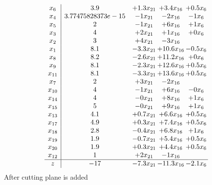\documentclass[11pt]{article}
\begin{document}
\[\begin{array}{c| c c@{\hskip 2pt} c@{\hskip 2pt} c@{\hskip 2pt} }
 x_{6}   &  3.9 & + 1.3 x_{21} & + 3.4 x_{16} & + 0.5 x_{6}\\
 x_{4}   &  3.77475828373e-15 & -1 x_{21} & -2 x_{16} & -1 x_{6}\\
 x_{5}   &  2 & -1 x_{21} & + 6 x_{16} & + 1 x_{6}\\
 x_{3}   &  4 & + 2 x_{21} & + 1 x_{16} & + 0 x_{6}\\
 x_{2}   &  3 & + 4 x_{21} & -3 x_{16} &   \\
 x_{1}   &  8.1 & -3.3 x_{21} & + 10.6 x_{16} & -0.5 x_{6}\\
 x_{8}   &  8.2 & -2.6 x_{21} & + 11.2 x_{16} & + 0 x_{6}\\
 x_{9}   &  8.1 & -2.3 x_{21} & + 12.6 x_{16} & + 0.5 x_{6}\\
 x_{11}   &  8.1 & -3.3 x_{21} & + 13.6 x_{16} & + 0.5 x_{6}\\
 x_{7}   &  2 & + 3 x_{21} & -2 x_{16} &   \\
 x_{10}   &  4 & -1 x_{21} & + 6 x_{16} & -0 x_{6}\\
 x_{14}   &  4 & -0 x_{21} & + 8 x_{16} & + 1 x_{6}\\
 x_{15}   &  5 & -0 x_{21} & + 9 x_{16} & + 1 x_{6}\\
 x_{13}   &  4.1 & + 0.7 x_{21} & + 6.6 x_{16} & + 0.5 x_{6}\\
 x_{17}   &  4.9 & + 0.3 x_{21} & + 7.4 x_{16} & + 0.5 x_{6}\\
 x_{18}   &  2.8 & -0.4 x_{21} & + 6.8 x_{16} & + 1 x_{6}\\
 x_{19}   &  1.9 & -0.7 x_{21} & + 5.4 x_{16} & + 0.5 x_{6}\\
 x_{20}   &  1.9 & + 0.3 x_{21} & + 4.4 x_{16} & + 0.5 x_{6}\\
 x_{12}   &  1 & + 2 x_{21} & -1 x_{16} &   \\
\hline
z    &  -17 & -7.3 x_{21} & -11.3 x_{16} & -2.1 x_{6}\\
\end{array}\]
 After cutting plane is added 
\end{document}

